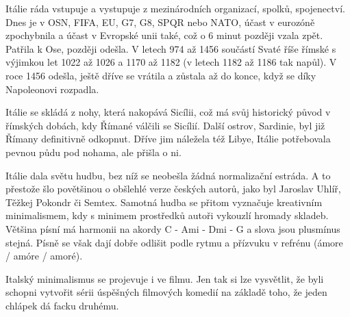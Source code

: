 \documentclass[10.5pt]{book}
\begin{document}
Itálie ráda vstupuje a vystupuje z mezinárodních organizací, spolků,
spojenectví. Dnes je v OSN, FIFA, EU, G7, G8, SPQR nebo NATO, účast v eurozóně
zpochybnila a účast v Evropské unii také, což o 6 minut později vzala zpět.
Patřila k Ose, později odešla. V letech 974 až 1456 součástí Svaté říše římské
s výjimkou let 1022 až 1026 a 1170 až 1182 (v letech 1182 až 1186 tak napůl).
V roce 1456 odešla, ještě dříve se vrátila a zůstala až do konce, když se díky
Napoleonovi rozpadla. 

Itálie se skládá z nohy, která nakopává Sicílii, což má svůj historický původ
v římských dobách, kdy Římané válčili se Sicílií. Další ostrov, Sardinie, byl
již Římany definitivně odkopnut. Dříve jim náležela též Libye, Itálie
potřebovala pevnou půdu pod nohama, ale přišla o ni. 

Itálie dala světu hudbu, bez níž se neobešla žádná normalizační estráda. A to
přestože šlo povětšinou o obšlehlé verze českých autorů, jako byl Jaroslav
Uhlíř, Těžkej Pokondr či Semtex. Samotná hudba se přitom vyznačuje kreativním
minimalismem, kdy s minimem prostředků autoři vykouzlí hromady skladeb. Většina
písní má harmonii na akordy C - Ami - Dmi - G a slova jsou plusmínus stejná.
Písně se však dají dobře odlišit podle rytmu a přízvuku v refrénu
(ámore / amóre / amoré).

Italský minimalismus se projevuje i ve filmu. Jen tak si lze
vysvětlit, že byli schopni vytvořit sérii úspěšných filmových
komedií na základě toho, že jeden chlápek dá facku druhému. 

\newpage
\thispagestyle{empty}

\end{document}
